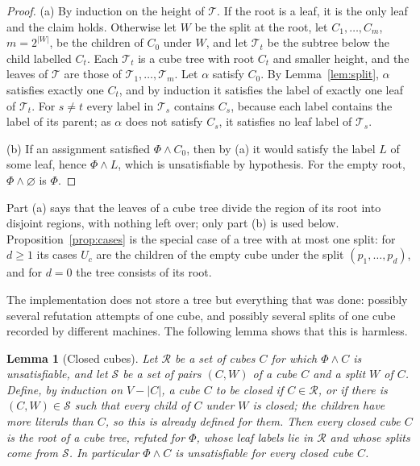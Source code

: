 \documentclass[11pt,reqno]{amsart}
\theoremstyle{plain}
\newtheorem{lemma}[theorem]{Lemma}
\theoremstyle{definition}
\begin{document}
\begin{proof}
(a) By induction on the height of $\mathcal{T}$. If the root is a leaf, it is the only leaf and
the claim holds. Otherwise let $W$ be the split at the root, let $C_1,\dots,C_m$, $m=2^{|W|}$, be
the children of $C_0$ under $W$, and let $\mathcal{T}_t$ be the subtree below the child labelled
$C_t$. Each $\mathcal{T}_t$ is a cube tree with root $C_t$ and smaller height, and the leaves of
$\mathcal{T}$ are those of $\mathcal{T}_1,\dots,\mathcal{T}_m$. Let $\alpha$ satisfy $C_0$. By
Lemma~\ref{lem:split}, $\alpha$ satisfies exactly one $C_t$, and by induction it satisfies the
label of exactly one leaf of $\mathcal{T}_t$. For $s\ne t$ every label in $\mathcal{T}_s$ contains
$C_s$, because each label contains the label of its parent; as $\alpha$ does not satisfy $C_s$, it
satisfies no leaf label of $\mathcal{T}_s$.

(b) If an assignment satisfied $\Phi\wedge C_0$, then by (a) it would satisfy the label $L$ of
some leaf, hence $\Phi\wedge L$, which is unsatisfiable by hypothesis. For the empty root,
$\Phi\wedge\varnothing$ is $\Phi$.
\end{proof}

Part (a) says that the leaves of a cube tree divide the region of its root into disjoint regions,
with nothing left over; only part (b) is used below. Proposition~\ref{prop:cases} is the special
case of a tree with at most one split: for $d\ge1$ its cases $U_c$ are the children of the empty
cube under the split $(p_1,\dots,p_d)$, and for $d=0$ the tree consists of its root.

The implementation does not store a tree but everything that was done: possibly several
refutation attempts of one cube, and possibly several splits of one cube recorded by different
machines. The following lemma shows that this is harmless.

\begin{lemma}[Closed cubes]\label{lem:closure}
Let $\mathcal{R}$ be a set of cubes $C$ for which $\Phi\wedge C$ is unsatisfiable, and let
$\mathcal{S}$ be a set of pairs $(C,W)$ of a cube $C$ and a split $W$ of $C$. Define, by induction
on $V-|C|$, a cube $C$ to be \emph{closed} if $C\in\mathcal{R}$, or if there is
$(C,W)\in\mathcal{S}$ such that every child of $C$ under $W$ is closed; the children have more
literals than $C$, so this is already defined for them. Then every closed cube $C$ is the root of
a cube tree, refuted for $\Phi$, whose leaf labels lie in $\mathcal{R}$ and whose splits come from
$\mathcal{S}$. In particular $\Phi\wedge C$ is unsatisfiable for every closed cube $C$.
\end{lemma}
\end{document}
